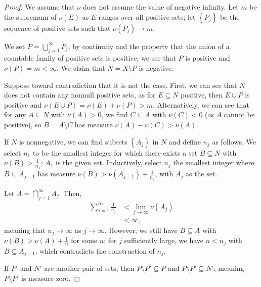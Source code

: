 \documentclass[12pt]{extarticle}
\newcommand{\set}[1]{\left\{#1\right\}}
\theoremstyle{plain}
\theoremstyle{definition}
\theoremstyle{note}
\renewcommand{\newline}{\hfill\break}
\begin{document}
\begin{proof}
  We assume that $\nu$ does not assume the value of negative infinity. Let $m$ be the supremum of $\nu(E)$ as $E$ ranges over all positive sets; let $\set{P_j}$ be the sequence of positive sets such that $\nu(P_j) \rightarrow m$.\newline

  We set $P = \bigcup_{j=1}^{\infty}P_j$; by continuity and the property that the union of a countable family of positive sets is positive, we see that $P$ is positive and $\nu(P) = m < \infty$. We claim that $N = X\setminus P$ is negative.\newline

  Suppose toward contradiction that it is not the case. First, we can see that $N$ does not contain any nonnull positive sets, as for $E\subseteq N$ positive, then $E\cup P$ is positive and $\nu(E\cup P) = \nu(E) + \nu(P) > m$. Alternatively, we can see that for any $A\subseteq N$ with $\nu(A) > 0$, we find $C\subseteq A$ with $\nu(C) < 0$ (as $A$ cannot be positive), so $B = A\setminus C$ has measure $\nu(A) - \nu(C) > \nu(A)$.\newline

  If $N$ is nonnegative, we can find subsets $\set{A_j}$ in $N$ and define $n_j$ as follows. We select $n_1$ to be the smallest integer for which there exists a set $B\subseteq N$ with $\nu(B) > \frac{1}{n_1}$; $A_1$ is the given set. Inductively, select $n_j$ the smallest integer where $B\subseteq A_{j-1}$ has measure $\nu(B) > \nu(A_{j-1}) + \frac{1}{n_j}$, with $A_j$ as the set.\newline

  Let $A = \bigcap_{j=1}^{\infty}A_j$. Then,
  \begin{align*}
    \sum_{j=1}^{\infty}\frac{1}{n_j} &< \lim_{j\rightarrow\infty}\nu\left(A_j\right)\\
                                     &<\infty,
  \end{align*}
  meaning that $n_j \rightarrow\infty$ as $j\rightarrow\infty$. However, we still have $B\subseteq A$ with $\nu(B) > \nu(A) + \frac{1}{n}$ for some $n$; for $j$ sufficiently large, we have $n < n_j$ with $B\subseteq A_{j-1}$, which contradicts the construction of $n_j$.\newline

  If $P'$ and $N'$ are another pair of sets, then $P\setminus P' \subseteq P$ and $P\setminus P' \subseteq N'$, meaning $P\setminus P'$ is measure zero.
\end{proof}
\end{document}
